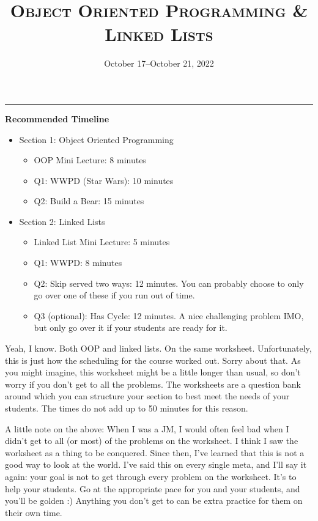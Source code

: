 \documentclass{exam}
\title{\textsc{Object Oriented Programming \titlebreak \& Linked Lists}}
\date{October 17--October 21, 2022}
\begin{document}
	\maketitle
	\rule{\textwidth}{0.15em}
	\fontsize{12}{15}\selectfont

\begin{meta}
	\textbf{Recommended Timeline}
	\begin{itemize}
		\item Section 1: Object Oriented Programming
		\begin{itemize}
		\item OOP Mini Lecture: 8 minutes
		\item Q1: WWPD (Star Wars): 10 minutes
		\item Q2: Build a Bear: 15 minutes
		\end{itemize}
		\item Section 2: Linked Lists
		\begin{itemize}
			\item Linked List Mini Lecture: 5 minutes
			\item Q1: WWPD: 8 minutes
			\item Q2: Skip served two ways: 12 minutes. You can probably choose to only go over one of these if you run out of time. 
			\item Q3 (optional): Has Cycle: 12 minutes. A nice challenging problem IMO, but only go over it if your students are ready for it. 
		\end{itemize}
	\end{itemize}
Yeah, I know. Both OOP and linked lists. On the same worksheet. Unfortunately, this is just how the scheduling for the course worked out. Sorry about that. As you might imagine, this worksheet might be a little longer than usual, so don't worry if you don't get to all the problems. The worksheets are a question bank around which you can structure your section to best meet the needs of your students. The times do not add up to 50 minutes for this reason. 

A little note on the above: When I was a JM, I would often feel bad when I didn't get to all (or most) of the problems on the worksheet. I think I saw the worksheet as a thing to be conquered. Since then, I've learned that this is not a good way to look at the world. I've said this on every single meta, and I'll say it again: your goal is not to get through every problem on the worksheet. It's to help your students. Go at the appropriate pace for you and your students, and you'll be golden :) Anything you don't get to can be extra practice for them on their own time. 


\end{meta}
\end{document}
